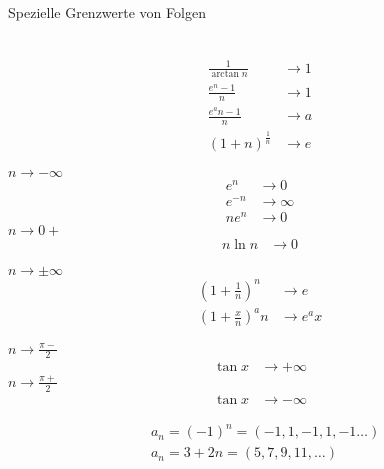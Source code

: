 \begin{highlight}{Spezielle Grenzwerte von Folgen}
\begin{minipage}{0.3\linewidth}
\begin{align*}
        \end{align*}
    \end{minipage}
    \hfill\vline\hfill
    \begin{minipage}{0.3\linewidth}
        \begin{align*}
            \frac{1}{\arctan n} &\to 1\\
            \frac{e^n - 1}{n} &\to 1\\
            \frac{e^an - 1}{n} &\to a\\
            \left(1 + n\right)^{\frac{1}{n}} &\to e
        \end{align*}
    \end{minipage}
     \begin{minipage}{0.3\linewidth}
        \emph{$n \to -\infty$}
        \begin{align*}
            e^n &\to 0\\
            e^{-n} &\to \infty\\
            ne^n &\to 0
        \end{align*}
        \emph{$n \to 0+$}
        \begin{align*}
            n \ln n &\to 0
        \end{align*}
    \end{minipage}
    \hfill\vline\hfill
    \begin{minipage}{0.3\linewidth}
        \emph{$n \to \pm\infty$}
        \begin{align*}
            \left(1 + \frac{1}{n}\right)^n &\to e\\
            \left(1 + \frac{x}{n}\right)^an &\to e^ax
        \end{align*}
    \end{minipage}
    \hfill\vline\hfill
    \begin{minipage}{0.3\linewidth}
    \emph{$n \to \frac{\pi-}{2}$}
        \begin{align*}
            \tan x &\to +\infty
        \end{align*}
    \emph{$n \to \frac{\pi+}{2}$}
        \begin{align*}
            \tan x &\to -\infty
        \end{align*}
    \end{minipage}
    \begin{align*}
        &a_{n}=(-1)^{n}=(-1,1,-1,1,-1 \ldots) \\
        &a_{n}=3+2 n=(5,7,9,11, \ldots)
    \end{align*}
\end{highlight}

